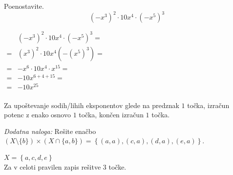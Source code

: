\documentclass[addpoints]{exam}
\begin{document}
\begin{questions}
    \question[3]
    Poenostavite. $$ \left(-x^3\right)^2\cdot 10x^4\cdot\left(-x^5\right)^3$$

    \begin{solution}[7cm]
            $\begin{aligned}
                &\left(-x^3\right)^2\cdot 10x^4\cdot\left(-x^5\right)^3= \\
                    =& (x^3)^2\cdot 10x^4(-(x^5)^3)=\\
                    =& -x^6\cdot 10x^4\cdot x^{15}= \\
                    =& -10x^{6+4+15}= \\
                    =& -10x^{25}
            \end{aligned} $ \\ \\
            Za upoštevanje sodih/lihih eksponentov glede na predznak $1$ točka, izračun potenc z enako osnovo $1$ točka, končen izračun $1$ točka.
    \end{solution}


    
    \bonusquestion[3]
    \textit{Dodatna naloga:} Rešite enačbo $(X\setminus\{b\})\times(X \cap \{a,b\})=\left\{(a,a),(c,a),(d,a),(e,a)\right\}$.

    \begin{solution}
        $X=\left\{a,c,d,e\right\}$ \\
        Za v celoti pravilen zapis rešitve $3$ točke.
    \end{solution}


\end{questions}
\end{document}
